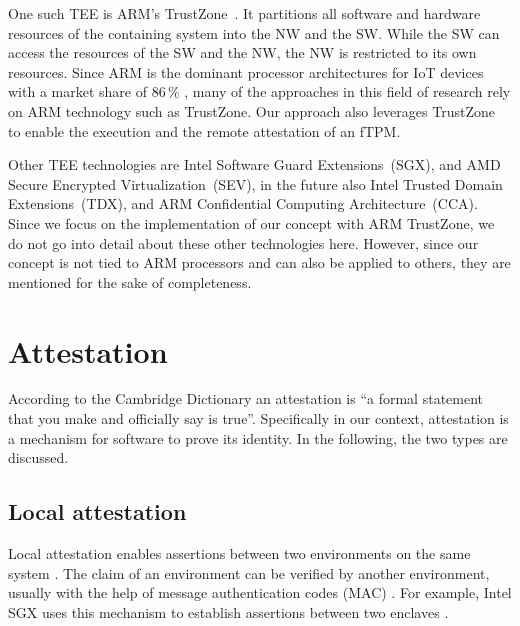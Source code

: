 One such \ac{TEE} is ARM's TrustZone~\cite{ARM09, Ngabonziza2016}. It partitions all software and hardware resources of the containing system into the \ac{NW} and the \ac{SW}.
While the \ac{SW} can access the resources of the \ac{SW} and the \ac{NW}, the \ac{NW} is restricted to its own resources.
Since ARM is the dominant processor architectures for IoT devices with a market share of 86\,\% \cite{eclipse}, many of the approaches in this field of research rely on ARM technology such as TrustZone.
Our approach also leverages TrustZone to enable the execution and the remote attestation of an fTPM.

Other \ac{TEE} technologies are Intel Software Guard Extensions~(SGX), and AMD Secure Encrypted Virtualization~(SEV), in the future also Intel Trusted Domain Extensions~(TDX), and ARM Confidential Computing Architecture~(CCA). Since we focus on the implementation of our concept with ARM TrustZone, we do not go into detail about these other technologies here. However, since our concept is not tied to ARM processors and can also be applied to others, they are mentioned for the sake of completeness.




\section{Attestation}

According to the Cambridge Dictionary an attestation is ``a formal statement that you make and officially say is true''.
Specifically in our context, attestation is a mechanism for software to prove its identity.
In the following, the two types are discussed.


\subsection{Local attestation}

Local attestation enables assertions between two environments on the same system \cite{Anati2013InnovativeTF}. The claim of an environment can be verified by another environment, usually with the help of message authentication codes (MAC) \cite{Menetrey2022}. For example, Intel SGX uses this mechanism to establish assertions between two enclaves \cite{Anati2013InnovativeTF}.

